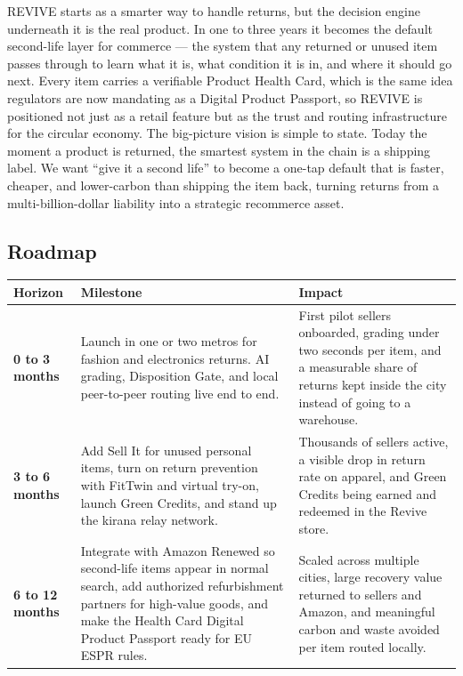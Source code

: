 \documentclass[11pt]{article}
\newcommand{\placeholder}[1]{{\color{placeGray} #1}}
\begin{document}
\placeholder{REVIVE starts as a smarter way to handle returns, but the decision engine underneath it is the real product. In one to three years it becomes the default second-life layer for commerce --- the system that any returned or unused item passes through to learn what it is, what condition it is in, and where it should go next. Every item carries a verifiable Product Health Card, which is the same idea regulators are now mandating as a Digital Product Passport, so REVIVE is positioned not just as a retail feature but as the trust and routing infrastructure for the circular economy. The big-picture vision is simple to state. Today the moment a product is returned, the smartest system in the chain is a shipping label. We want ``give it a second life'' to become a one-tap default that is faster, cheaper, and lower-carbon than shipping the item back, turning returns from a multi-billion-dollar liability into a strategic recommerce asset.}

\subsection{Roadmap}
\renewcommand{\arraystretch}{1.6}
\begin{tabularx}{\textwidth}{|L{0.18\textwidth}|X|L{0.36\textwidth}|}
\hline
{}
{\color{white}\bfseries Horizon} & {\color{white}\bfseries Milestone} & {\color{white}\bfseries Impact} \\ \hline
\textbf{0 to 3 months} & Launch in one or two metros for fashion and electronics returns. AI grading, Disposition Gate, and local peer-to-peer routing live end to end. & First pilot sellers onboarded, grading under two seconds per item, and a measurable share of returns kept inside the city instead of going to a warehouse. \\ \hline
{}
\textbf{3 to 6 months} & Add Sell It for unused personal items, turn on return prevention with FitTwin and virtual try-on, launch Green Credits, and stand up the kirana relay network. & Thousands of sellers active, a visible drop in return rate on apparel, and Green Credits being earned and redeemed in the Revive store. \\ \hline
\textbf{6 to 12 months} & Integrate with Amazon Renewed so second-life items appear in normal search, add authorized refurbishment partners for high-value goods, and make the Health Card Digital Product Passport ready for EU ESPR rules. & Scaled across multiple cities, large recovery value returned to sellers and Amazon, and meaningful carbon and waste avoided per item routed locally. \\ \hline
\end{tabularx}
\end{document}
